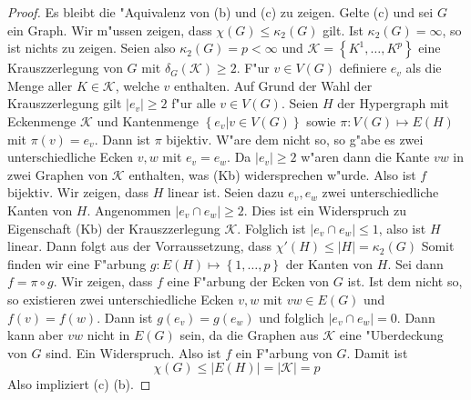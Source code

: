 \begin{proof}
  Es bleibt die "Aquivalenz von (b) und (c) zu zeigen. 
  Gelte (c) und sei $G$ ein Graph. Wir m"ussen zeigen, dass $\chi(G) \leq \kappa_{2}(G)$ gilt. Ist $\kappa_{2}(G) = \infty$, so ist nichts zu zeigen. Seien also $\kappa_{2}(G) = p < \infty $ und $\mathcal{K}= \left\{ K^{1},\dots,K^{p} \right\}$ eine Krauszzerlegung von $G$ mit $\delta_{G}(\mathcal{K}) \geq 2 $.  
  F"ur $v\in V(G)$ definiere $e_v$ als die Menge aller $K\in \mathcal{K}$, welche $v$ enthalten. Auf Grund der Wahl der Krauszzerlegung gilt $|e_v| \geq 2$ f"ur alle $v \in V(G)$. Seien $H$ der Hypergraph mit Eckenmenge $\mathcal{K}$ und Kantenmenge $\left\{ e_v| v\in V(G) \right\}$ sowie $\pi: V(G) \mapsto E(H)$ mit $\pi(v) = e_v$. Dann ist $\pi$ bijektiv. W"are dem nicht so, so g"abe es zwei unterschiedliche Ecken $v,w$ mit $e_v = e_w$. 
  Da $|e_v| \geq 2$ w"aren dann die Kante $vw$ in zwei Graphen von $\mathcal{K}$ enthalten, was (Kb) widersprechen w"urde. Also ist $f$ bijektiv.
  Wir zeigen, dass $H$ linear ist. 
  Seien dazu $e_{v},e_{w} $ zwei unterschiedliche Kanten von $H$.
  Angenommen $|e_{v}\cap e_{w}| \geq 2$. Dies ist ein Widerspruch zu Eigenschaft (Kb) der Krauszzerlegung $\mathcal{K}$. Folglich ist $|e_{v}\cap e_{w}| \leq 1$, also ist $H$ linear. Dann folgt aus der Vorraussetzung, dass $\chi'(H) \leq |H| = \kappa_{2}(G)$ 
  Somit finden wir eine F"arbung $g : E(H) \mapsto \left\{ 1,\dots,p \right\}$ der Kanten von $H$. Sei dann $f =  \pi \circ g$. Wir zeigen, dass $f$ eine F"arbung der Ecken von $G$ ist. Ist dem nicht so, so existieren zwei unterschiedliche Ecken $v,w$ mit $vw\in E(G)$ und $f(v) = f(w)$. Dann ist $g(e_v) = g(e_w)$ und folglich $|e_v  \cap e_w | = 0$. Dann kann aber $vw$ nicht in $E(G)$ sein, da die Graphen aus $\mathcal{K}$ eine "Uberdeckung von $G$ sind. Ein
  Widerspruch. Also ist $f$ ein F"arbung von $G$. Damit ist 
  \begin{equation*}
    \chi(G) \leq |E(H)| = |\mathcal{K}| = p
  \end{equation*}
  Also impliziert (c) (b). 


\end{proof}
